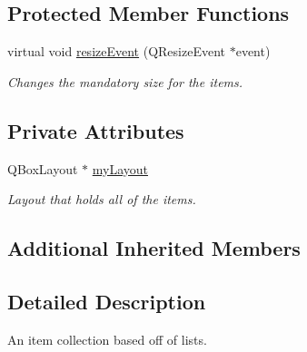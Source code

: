 \subsection*{Protected Member Functions}
\begin{DoxyCompactItemize}
\item 
virtual void \hyperlink{class_u_i_1_1_item_list_widget_a23d52e3b1d200ed888065bb93a460358}{resize\-Event} (Q\-Resize\-Event $\ast$event)
\begin{DoxyCompactList}\small\item\em Changes the mandatory size for the items. \end{DoxyCompactList}\end{DoxyCompactItemize}
\subsection*{Private Attributes}
\begin{DoxyCompactItemize}
\item 
\hypertarget{class_u_i_1_1_item_list_widget_a8ee7d505fadfaef00c6643149b97e04f}{Q\-Box\-Layout $\ast$ \hyperlink{class_u_i_1_1_item_list_widget_a8ee7d505fadfaef00c6643149b97e04f}{my\-Layout}}\label{class_u_i_1_1_item_list_widget_a8ee7d505fadfaef00c6643149b97e04f}

\begin{DoxyCompactList}\small\item\em Layout that holds all of the items. \end{DoxyCompactList}\end{DoxyCompactItemize}
\subsection*{Additional Inherited Members}


\subsection{Detailed Description}
An item collection based off of lists. 

